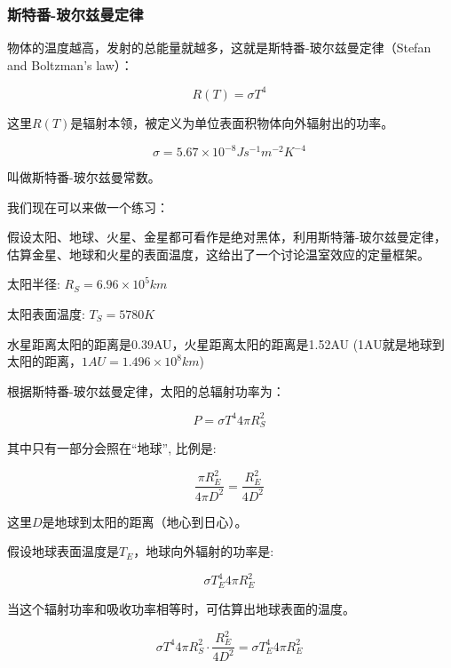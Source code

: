 \subsubsection{斯特番-玻尔兹曼定律}

物体的温度越高，发射的总能量就越多，这就是斯特番-玻尔兹曼定律（Stefan and Boltzman's law）：

\begin{equation}
R(T) = \sigma T^4~
\end{equation}

这里$R(T)$是辐射本领，被定义为单位表面积物体向外辐射出的功率。

\begin{equation}
\sigma = 5.67 \times 10^{-8} J s^{-1} m^{-2} K^{-4}~
\end{equation}

叫做斯特番-玻尔兹曼常数。

我们现在可以来做一个练习：

假设太阳、地球、火星、金星都可看作是绝对黑体，利用斯特藩-玻尔兹曼定律，估算金星、地球和火星的表面温度，这给出了一个讨论温室效应的定量框架。

太阳半径: $R_S  = 6.96 \times 10^5 km$

太阳表面温度: $T_S  = 5780K$

水星距离太阳的距离是0.39AU，火星距离太阳的距离是1.52AU (1AU就是地球到太阳的距离，$1AU = 1.496 \times 10^8 km$)

根据斯特番-玻尔兹曼定律，太阳的总辐射功率为：

\begin{equation}
P = \sigma T^4 4 \pi R_S^2~
\end{equation}

其中只有一部分会照在“地球”, 比例是: 

\begin{equation}
\frac{\pi R_E^2}{4 \pi D^2}= \frac{R_E^2}{4 D^2}~
\end{equation}

这里$D$是地球到太阳的距离（地心到日心）。

假设地球表面温度是$T_E$，地球向外辐射的功率是: 

\begin{equation}
\sigma T_E^4 4 \pi R_E^2~
\end{equation}

当这个辐射功率和吸收功率相等时，可估算出地球表面的温度。

\begin{equation}
\sigma T^4 4 \pi R_S^2 \cdot \frac{R_E^2}{4 D^2} = \sigma T_E^4 4 \pi R_E^2~
\end{equation}

